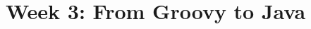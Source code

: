 \documentclass[11pt,a4paper]{book}
\begin{document}
%
% 
\chapter{Week 3: From Groovy to Java}




\end{document}
